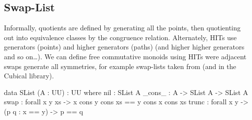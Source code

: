 \subsection{Swap-List}\label{cmon:slist}

Informally, quotients are defined by generating all the points, then quotienting out into equivalence classes by the
congruence relation.
%
Alternately, HITs use generators (points) and higher generators (paths) (and higher higher generators and so on\ldots).
%
We can define free commutative monoids using HITs were adjacent swaps generate all symmetries,
for example swap-lists taken from \cite{choudhuryFreeCommutativeMonoids2023} (and in the Cubical library).
\begin{code}
data SList (A : UU) : UU where
  nil : SList A
  _cons_ : A -> SList A -> SList A
  swap : forall x y xs -> x cons y cons xs == y cons x cons xs
  trunc : forall x y -> (p q : x == y) -> p == q
\end{code}

